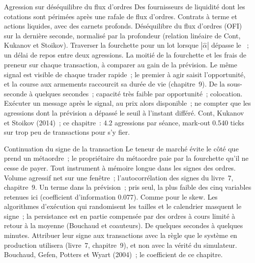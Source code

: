 \begin{strategyfile}{Agression sur déséquilibre du flux d'ordres}\label{strat:hf:short-horizon-alpha:ofi}
 Des fournisseurs de liquidité dont les cotations sont périmées après une rafale de flux d'ordres.
 Contrats à terme et actions liquides, avec des carnets profonds.
 Déséquilibre du flux d'ordres (OFI) sur la dernière seconde, normalisé par la profondeur (relation linéaire de Cont, Kukanov et Stoikov).
 Traverser la fourchette pour un lot lorsque $|\hat\alpha|$ dépasse le ~; un délai de repos entre deux agressions.
 La moitié de la fourchette et les frais de preneur sur chaque transaction, à comparer au gain de la prévision.
 Le même signal est visible de chaque trader rapide~; le premier à agir saisit l'opportunité, et la course aux armements raccourcit
sa durée de vie (chapitre~9).
 De la sous-seconde à quelques secondes~; capacité très faible par opportunité~; colocation.
 Exécuter un message après le signal, au prix alors disponible~; ne compter que les agressions dont la prévision a dépassé le
seuil à l'instant différé.
 Cont, Kukanov et Stoikov (2014)~; ce chapitre~: 4.2 agressions par séance, mark-out 0.540 ticks sur trop peu de transactions pour s'y fier.
\end{strategyfile}

\begin{strategyfile}{Continuation du signe de la transaction}\label{strat:hf:short-horizon-alpha:sign}
 Le teneur de marché évite le côté que prend un métaordre~; le propriétaire du métaordre paie par la fourchette qu'il ne cesse
de payer.
 Tout instrument à mémoire longue dans les signes des ordres.
 Volume agressif net sur une fenêtre~; l'autocorrélation des signes du livre~7, chapitre~9.
 Un terme dans la prévision~; pris seul, la plus faible des cinq variables retenues ici (coefficient d'information 0.077).
 Comme pour le skew.
 Les algorithmes d'exécution qui randomisent les tailles et le calendrier masquent le signe~; la persistance est en partie compensée par des ordres à cours limité
à retour à la moyenne (Bouchaud et coauteurs).
 De quelques secondes à quelques minutes.
 Attribuer leur signe aux transactions avec la règle que le système en production utilisera (livre~7, chapitre~9), et non avec la vérité du simulateur.
 Bouchaud, Gefen, Potters et Wyart (2004)~; le coefficient de ce chapitre.
\end{strategyfile}


